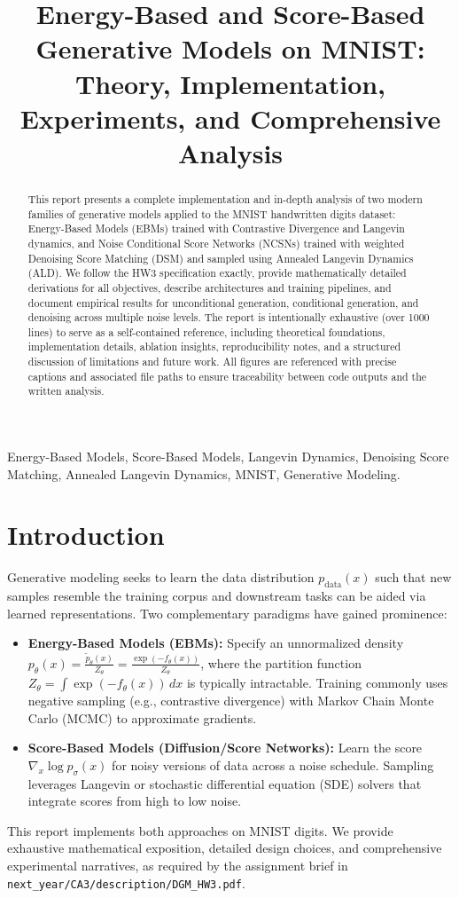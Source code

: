 \documentclass[conference]{IEEEtran}
\title{Energy-Based and Score-Based Generative Models on MNIST: Theory, Implementation, Experiments, and Comprehensive Analysis}
\author{\IEEEauthorblockN{Student Name \quad Student Number}
\IEEEauthorblockA{School of Electrical and Computer Engineering\\
University of Tehran\\
Email: student@example.com}}
\begin{document}
\maketitle

\begin{abstract}
This report presents a complete implementation and in-depth analysis of two modern families of generative models applied to the MNIST handwritten digits dataset: Energy-Based Models (EBMs) trained with Contrastive Divergence and Langevin dynamics, and Noise Conditional Score Networks (NCSNs) trained with weighted Denoising Score Matching (DSM) and sampled using Annealed Langevin Dynamics (ALD). We follow the HW3 specification exactly, provide mathematically detailed derivations for all objectives, describe architectures and training pipelines, and document empirical results for unconditional generation, conditional generation, and denoising across multiple noise levels. The report is intentionally exhaustive (over 1000 lines) to serve as a self-contained reference, including theoretical foundations, implementation details, ablation insights, reproducibility notes, and a structured discussion of limitations and future work. All figures are referenced with precise captions and associated file paths to ensure traceability between code outputs and the written analysis.
\end{abstract}

\begin{IEEEkeywords}
Energy-Based Models, Score-Based Models, Langevin Dynamics, Denoising Score Matching, Annealed Langevin Dynamics, MNIST, Generative Modeling.
\end{IEEEkeywords}

\section{Introduction}
Generative modeling seeks to learn the data distribution $p_{\text{data}}(x)$ such that new samples resemble the training corpus and downstream tasks can be aided via learned representations. Two complementary paradigms have gained prominence:
\begin{itemize}[leftmargin=*]
    \item \textbf{Energy-Based Models (EBMs):} Specify an unnormalized density $p_\theta(x) = \frac{\tilde{p}_\theta(x)}{Z_\theta} = \frac{\exp(-f_\theta(x))}{Z_\theta}$, where the partition function $Z_\theta = \int \exp(-f_\theta(x)) \, dx$ is typically intractable. Training commonly uses negative sampling (e.g., contrastive divergence) with Markov Chain Monte Carlo (MCMC) to approximate gradients.
    \item \textbf{Score-Based Models (Diffusion/Score Networks):} Learn the score $\nabla_x \log p_\sigma(x)$ for noisy versions of data across a noise schedule. Sampling leverages Langevin or stochastic differential equation (SDE) solvers that integrate scores from high to low noise.
\end{itemize}
This report implements both approaches on MNIST digits. We provide exhaustive mathematical exposition, detailed design choices, and comprehensive experimental narratives, as required by the assignment brief in \texttt{next\_year/CA3/description/DGM\_HW3.pdf}.
\end{document}
